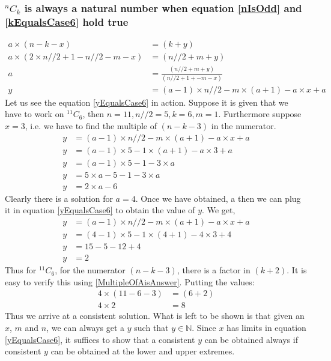 \documentclass[12pt, twoside]{article}
\newcommand*{\Combination}[2]{{}^{#1}C_{#2}}%
\begin{document}
\subsubsection{$\Combination{n}{k}$ is always a natural number when equation \eqref{nIsOdd} and \eqref{kEqualsCase6} hold true}\label{ProofkEqualsCase6}
\begin{align}
	a \times (n-k-x) &= (k+y) \nonumber \\
	a \times (2\times n//2 + 1 - n//2 -m - x) &= (n//2 +m + y) \nonumber \\
	a &= \frac{(n//2 +m  + y)}{(n//2 + 1 +-m - x)} \nonumber \\
	y &= (a-1)\times n//2 -m\times(a+1) - a\times x + a \label{yEqualsCase6}	
\end{align}
Let us see the equation \eqref{yEqualsCase6} in action. \newline
Suppose it is given that we have to work on $\Combination{11}{6}$, then $n=11,n//2=5,k=6,m=1$. Furthermore suppose $x=3$, i.e. we have to find the multiple of $(n-k-3)$ in the numerator.
\begin{align*}
	y &= (a-1)\times n//2 -m\times(a+1) - a\times x + a \\
	y &= (a-1)\times 5 - 1\times(a+1) - a\times 3 + a \\
	y &= (a-1)\times 5 -1 -3\times a \\
	y &= 5\times a - 5 -1 -3\times a \\
	y &= 2\times a - 6
\end{align*}
Clearly there is a solution for $a = 4$. Once we have obtained, a then we can plug it in equation \eqref{yEqualsCase6} to obtain the value of $y$. We get,
\begin{align*}
	y &= (a-1)\times n//2 -m\times(a+1) - a\times x + a \\
	y &= (4-1)\times 5 -1\times(4+1) - 4\times 3 + 4 \\
	y &= 15 - 5 -12 + 4 \\
	y &= 2
\end{align*}
Thus for $\Combination{11}{6}$, for the numerator $(n-k-3)$, there is a factor in $(k+2)$. It is easy to verify this using \eqref{MultipleOfAisAnswer}. Putting the values:
\begin{align*}
	4\times(11-6-3) &= (6+2)\\
	4\times 2 &= 8
\end{align*}
Thus we arrive at a consistent solution.\newline
What is left to be shown is that given an $x$, $m$ and $n$, we can always get a $y$ such that $y \in \mathbb{N}$. Since $x$ has limits in equation \eqref{yEqualsCase6}, it suffices to show that a consistent $y$ can be obtained always if consistent $y$ can be obtained at the lower and upper extremes.\newline
\end{document}
